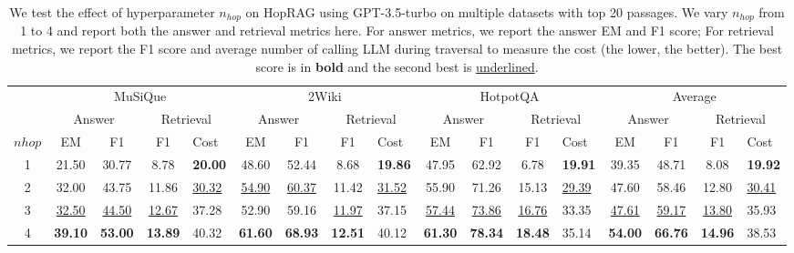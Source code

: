\begin{table*}[hb]
\setlength{\tabcolsep}{3pt}
\small
\centering
      \begin{tabular}{cccclccclccclcccl}
    \toprule
 & \multicolumn{4}{c}{MuSiQue}& \multicolumn{4}{c}{2Wiki}& \multicolumn{4}{c}{HotpotQA}& \multicolumn{4}{c}{Average}\\
 & \multicolumn{2}{c}{Answer}&\multicolumn{2}{c}{Retrieval}& \multicolumn{2}{c}{Answer}&\multicolumn{2}{c}{Retrieval}& \multicolumn{2}{c}{Answer}&\multicolumn{2}{c}{Retrieval}& \multicolumn{2}{c}{Answer}&\multicolumn{2}{c}{Retrieval}\\
        
        $n{hop}$& EM& F1 & F1  &Cost& EM& F1 & F1 
 &Cost& EM& F1 &F1 
  &Cost& EM& F1 &F1 
 &Cost\\
        \midrule
        1& 21.50 & 30.77 & 8.78 &\textbf{20.00}& 48.60 & 52.44 & 8.68 &\textbf{19.86}& 47.95 & 62.92 &6.78 &\textbf{19.91}&  39.35 & 48.71 &8.08 &\textbf{19.92}\\
        2& 
32.00 & 43.75 & 11.86 &\underline{30.32}& \underline{54.90}& \underline{60.37}& 11.42 &\underline{31.52}& 55.90 & 71.26 &15.13 &\underline{29.39}& 47.60 & 58.46 &12.80 &\underline{30.41}\\
 3& 
\underline{32.50}& \underline{44.50}& \underline{12.67}&37.28 & 52.90& 59.16& \underline{11.97}&37.15 & \underline{57.44}& \underline{73.86}&\underline{16.76}&33.35 & \underline{47.61}& \underline{59.17}&\underline{13.80}&35.93 \\ 
        4&    \textbf{39.10}&  \textbf{53.00}&  \textbf{13.89}&40.32& \textbf{61.60}& \textbf{68.93}& \textbf{12.51}&40.12& \textbf{61.30}& \textbf{78.34}&\textbf{18.48}&35.14& \textbf{54.00}& \textbf{66.76}&\textbf{14.96}&38.53 \\
        \bottomrule
    \end{tabular}
    \caption{    
   We test the effect of hyperparameter $n_{hop}$ on HopRAG using GPT-3.5-turbo on multiple datasets
with top 20 passages. We vary $n_{hop}$ from 1 to 4 and report both the answer and retrieval metrics here. For answer metrics, we report the answer EM and F1 score; For retrieval metrics, we report the F1 score and average number of calling
LLM during traversal to measure the cost (the lower, the better). The best score is in \textbf{bold} and the second best is
\underline{underlined}. 
    }
    \label{tab:nhopall}
\end{table*}
